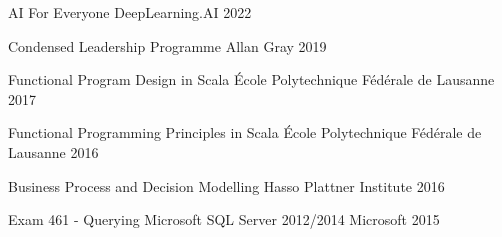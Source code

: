     \vspace{1.0mm}
    \begin{cvhonors}
        \cvhonor
            {AI For Everyone}
            {DeepLearning.AI}
            {}
            {2022}

        \cvhonor
            {Condensed Leadership Programme}
            {Allan Gray}
            {}
            {2019}

        \cvhonor
            {Functional Program Design in Scala}
            {École Polytechnique Fédérale de Lausanne}
            {}
            {2017}

        \cvhonor
            {Functional Programming Principles in Scala}
            {École Polytechnique Fédérale de Lausanne}
            {}
            {2016}

        \cvhonor
            {Business Process and Decision Modelling}
            {Hasso Plattner Institute}
            {}
            {2016}

        \cvhonor
            {Exam 461 - Querying Microsoft SQL Server 2012/2014}
            {Microsoft}
            {}
            {2015}

    \end{cvhonors}
